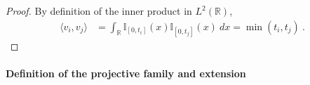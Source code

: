 \begin{proof}\leanok
By definition of the inner product in $L^2(\mathbb{R})$,
\begin{align*}
  \langle v_i, v_j \rangle
  &= \int_{\mathbb{R}} \mathbb{I}_{[0, t_i]}(x) \mathbb{I}_{[0, t_j]}(x) \: dx
  = \min(t_i, t_j)
  \: .
\end{align*}
\end{proof}






\paragraph{Definition of the projective family and extension}







